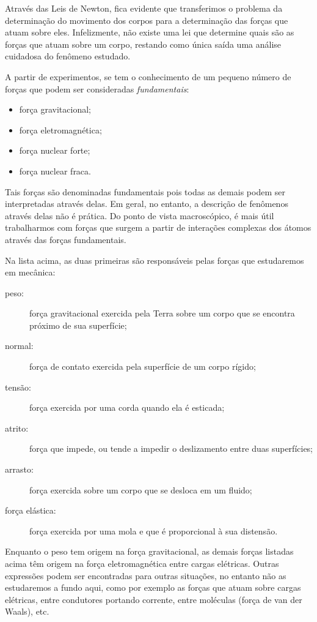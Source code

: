 Através das Leis de Newton, fica evidente que transferimos o problema da determinação do movimento dos corpos para a determinação das forças que atuam sobre eles. Infelizmente, não existe uma lei que determine quais são as forças que atuam sobre um corpo, restando como única saída uma análise cuidadosa do fenômeno estudado.

A partir de experimentos, se tem o conhecimento de um pequeno número de forças que podem ser consideradas \emph{fundamentais}:
\begin{itemize}
  \item força gravitacional;
  \item força eletromagnética;
  \item força nuclear forte;
  \item força nuclear fraca.
\end{itemize}
%
Tais forças são denominadas fundamentais pois todas as demais podem ser interpretadas através delas. Em geral, no entanto, a descrição de fenômenos através delas não é prática. Do ponto de vista macroscópico, é mais útil trabalharmos com forças que surgem a partir de interações complexas dos átomos através das forças fundamentais.

Na lista acima, as duas primeiras são responsáveis pelas forças que estudaremos em mecânica:
\begin{description}
    \item[peso:] força gravitacional exercida pela Terra sobre um corpo que se encontra próximo de sua superfície;
    \item[normal:] força de contato exercida pela superfície de um corpo rígido;
    \item[tensão:] força exercida por uma corda quando ela é esticada;
    \item[atrito:] força que impede, ou tende a impedir o deslizamento entre duas superfícies;
    \item[arrasto:] força exercida sobre um corpo que se desloca em um fluido;
    \item[força elástica:] força exercida por uma mola e que é proporcional à sua distensão.
\end{description}
%
Enquanto o peso tem origem na força gravitacional, as demais forças listadas acima têm origem na força eletromagnética entre cargas elétricas. Outras expressões podem ser encontradas para outras situações, no entanto não as estudaremos a fundo aqui, como por exemplo as forças que atuam sobre cargas elétricas, entre condutores portando corrente, entre moléculas (força de van der Waals), etc.

